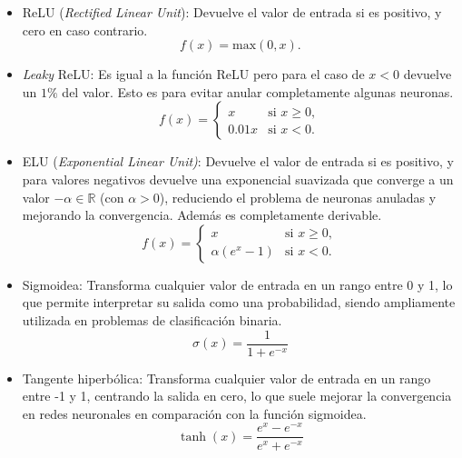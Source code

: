 \begin{itemize}

    \item ReLU (\emph{Rectified Linear Unit}): Devuelve el valor de entrada si es positivo, y cero en caso contrario.
    \begin{equation}
        f(x) = \text{max}(0, x).
    \end{equation}
    
    \item \emph{Leaky} ReLU: Es igual a la función ReLU pero para el caso de $x<0$ devuelve un $1\%$ del valor. Esto es para evitar anular completamente algunas neuronas.
    \begin{equation}
    f(x) = 
        \begin{cases}
        x & \text{si } x \geq 0, \\
        0.01x & \text{si } x < 0.
        \end{cases}
    \end{equation}

    \item ELU (\emph{Exponential Linear Unit)}: Devuelve el valor de entrada si es positivo, y para valores negativos devuelve una exponencial suavizada que converge a un valor $-\alpha\in\mathbb{R}$ (con $\alpha>0$), reduciendo el problema de neuronas anuladas y mejorando la convergencia. Además es completamente derivable.
    \begin{equation}
    f(x) = 
        \begin{cases}
        x & \text{si } x \geq 0, \\
        \alpha(e^x - 1) & \text{si } x < 0.
        \end{cases}
    \end{equation}
    
    \item Sigmoidea: Transforma cualquier valor de entrada en un rango entre 0 y 1, lo que permite interpretar su salida como una probabilidad, siendo ampliamente utilizada en problemas de clasificación binaria.
    \begin{equation}
        \sigma(x) = \frac{1}{1 + e^{-x}}
    \end{equation}
    
    \item Tangente hiperbólica: Transforma cualquier valor de entrada en un rango entre -1 y 1, centrando la salida en cero, lo que suele mejorar la convergencia en redes neuronales en comparación con la función sigmoidea.
    \begin{equation}
        \tanh(x) = \frac{e^x - e^{-x}}{e^x + e^{-x}}
    \end{equation}

\end{itemize}

